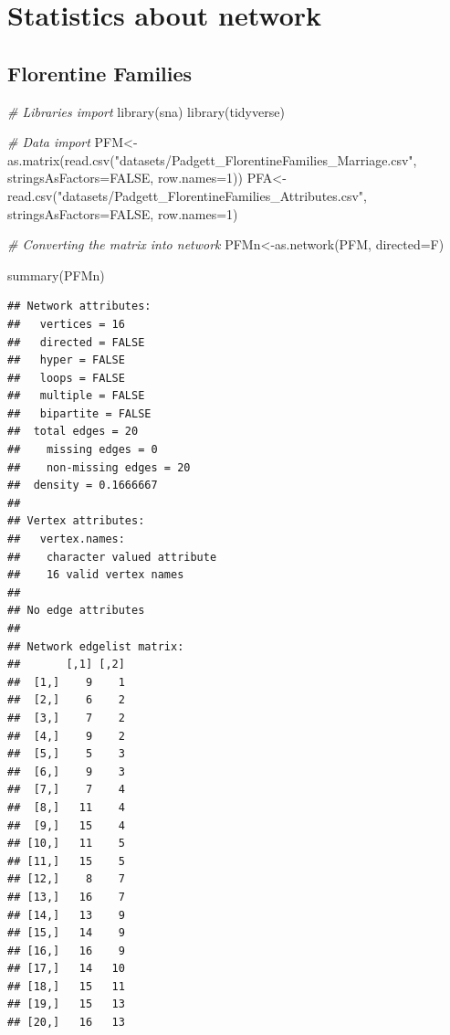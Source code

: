 \documentclass[
  notitlepage,
  onecolumn,
  openany]{book}
\newenvironment{Shaded}{\begin{snugshade}}{\end{snugshade}}
\newcommand{\AttributeTok}[1]{\textcolor[rgb]{0.77,0.63,0.00}{#1}}
\newcommand{\CommentTok}[1]{\textcolor[rgb]{0.56,0.35,0.01}{\textit{#1}}}
\newcommand{\ConstantTok}[1]{\textcolor[rgb]{0.00,0.00,0.00}{#1}}
\newcommand{\DecValTok}[1]{\textcolor[rgb]{0.00,0.00,0.81}{#1}}
\newcommand{\FunctionTok}[1]{\textcolor[rgb]{0.00,0.00,0.00}{#1}}
\newcommand{\NormalTok}[1]{#1}
\newcommand{\OtherTok}[1]{\textcolor[rgb]{0.56,0.35,0.01}{#1}}
\newcommand{\StringTok}[1]{\textcolor[rgb]{0.31,0.60,0.02}{#1}}
\begin{document}
\hypertarget{statistics-about-network}{%
\chapter{Statistics about network}\label{statistics-about-network}}

\hypertarget{florentine-families-1}{%
\section{Florentine Families}\label{florentine-families-1}}

\begin{Shaded}
\begin{Highlighting}[]
\CommentTok{\# Libraries import}
\FunctionTok{library}\NormalTok{(sna)}
\FunctionTok{library}\NormalTok{(tidyverse)}

\CommentTok{\# Data import}
\NormalTok{PFM}\OtherTok{\textless{}{-}}\FunctionTok{as.matrix}\NormalTok{(}\FunctionTok{read.csv}\NormalTok{(}\StringTok{"datasets/Padgett\_FlorentineFamilies\_Marriage.csv"}\NormalTok{,}
                        \AttributeTok{stringsAsFactors=}\ConstantTok{FALSE}\NormalTok{, }\AttributeTok{row.names=}\DecValTok{1}\NormalTok{))}
\NormalTok{PFA}\OtherTok{\textless{}{-}}\FunctionTok{read.csv}\NormalTok{(}\StringTok{"datasets/Padgett\_FlorentineFamilies\_Attributes.csv"}\NormalTok{,}
              \AttributeTok{stringsAsFactors=}\ConstantTok{FALSE}\NormalTok{, }\AttributeTok{row.names=}\DecValTok{1}\NormalTok{)}

\CommentTok{\# Converting the matrix into network}
\NormalTok{PFMn}\OtherTok{\textless{}{-}}\FunctionTok{as.network}\NormalTok{(PFM, }\AttributeTok{directed=}\NormalTok{F)}

\FunctionTok{summary}\NormalTok{(PFMn)}
\end{Highlighting}
\end{Shaded}

\begin{verbatim}
## Network attributes:
##   vertices = 16
##   directed = FALSE
##   hyper = FALSE
##   loops = FALSE
##   multiple = FALSE
##   bipartite = FALSE
##  total edges = 20 
##    missing edges = 0 
##    non-missing edges = 20 
##  density = 0.1666667 
## 
## Vertex attributes:
##   vertex.names:
##    character valued attribute
##    16 valid vertex names
## 
## No edge attributes
## 
## Network edgelist matrix:
##       [,1] [,2]
##  [1,]    9    1
##  [2,]    6    2
##  [3,]    7    2
##  [4,]    9    2
##  [5,]    5    3
##  [6,]    9    3
##  [7,]    7    4
##  [8,]   11    4
##  [9,]   15    4
## [10,]   11    5
## [11,]   15    5
## [12,]    8    7
## [13,]   16    7
## [14,]   13    9
## [15,]   14    9
## [16,]   16    9
## [17,]   14   10
## [18,]   15   11
## [19,]   15   13
## [20,]   16   13
\end{verbatim}
\end{document}
